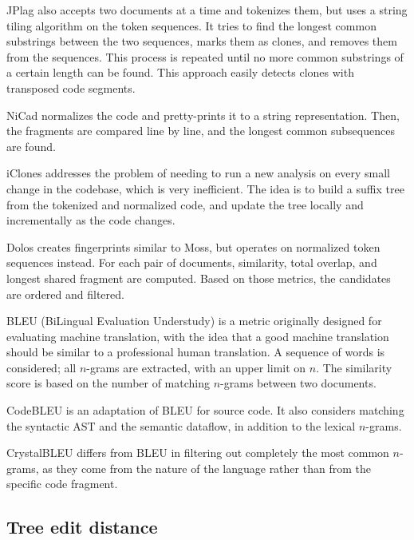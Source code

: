 JPlag \cite{jplag02} also accepts two documents at a time and tokenizes them, but uses a string tiling algorithm on the token sequences.
It tries to find the longest common substrings between the two sequences, marks them as clones, and removes them from the sequences.
This process is repeated until no more common substrings of a certain length can be found.
This approach easily detects clones with transposed code segments.

NiCad \cite{nicad08} normalizes the code and pretty-prints it to a string representation.
Then, the fragments are compared line by line, and the longest common subsequences are found.

iClones \cite{iclones09} addresses the problem of needing to run a new analysis on every small change in the codebase, which is very inefficient.
The idea is to build a suffix tree from the tokenized and normalized code, and update the tree locally and incrementally as the code changes.

Dolos \cite{dolos22} creates fingerprints similar to Moss, but operates on normalized token sequences instead. For each pair of documents, similarity, total overlap, and longest shared fragment are computed. Based on those metrics, the candidates are ordered and filtered.

BLEU (BiLingual Evaluation Understudy) \cite{bleu02} is a metric originally designed for evaluating machine translation, with the idea that a good machine translation should be similar to a professional human translation. A sequence of words is considered; all $n$-grams are extracted, with an upper limit on $n$. The similarity score is based on the number of matching $n$-grams between two documents.

CodeBLEU \cite{codebleu20} is an adaptation of BLEU for source code. It also considers matching the syntactic AST and the semantic dataflow, in addition to the lexical $n$-grams.

CrystalBLEU \cite{crystalbleu23} differs from BLEU in filtering out completely the most common $n$-grams, as they come from the nature of the language rather than from the specific code fragment.

\subsection{Tree edit distance}\label{sec:ted}

